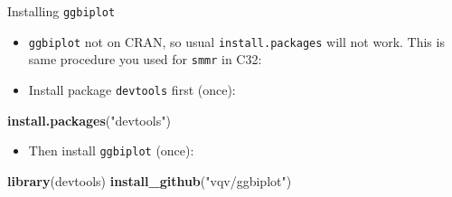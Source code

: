 \documentclass[
  ignorenonframetext,
]{beamer}
\newenvironment{Shaded}{\begin{snugshade}}{\end{snugshade}}
\newcommand{\KeywordTok}[1]{\textcolor[rgb]{0.13,0.29,0.53}{\textbf{#1}}}
\newcommand{\NormalTok}[1]{#1}
\newcommand{\StringTok}[1]{\textcolor[rgb]{0.31,0.60,0.02}{#1}}
\providecommand{\tightlist}{%
  \setlength{\itemsep}{0pt}\setlength{\parskip}{0pt}}
\begin{document}
\begin{frame}[fragile]{Installing \texttt{ggbiplot}}
\protect\hypertarget{installing-ggbiplot-1}{}

\begin{itemize}
\item
  \texttt{ggbiplot} not on CRAN, so usual \texttt{install.packages} will
  not work. This is same procedure you used for \texttt{smmr} in C32:
\item
  Install package \texttt{devtools} first (once):
\end{itemize}

\begin{Shaded}
\begin{Highlighting}[]
\KeywordTok{install.packages}\NormalTok{(}\StringTok{"devtools"}\NormalTok{)}
\end{Highlighting}
\end{Shaded}

\begin{itemize}
\tightlist
\item
  Then install \texttt{ggbiplot} (once):
\end{itemize}

\begin{Shaded}
\begin{Highlighting}[]
\KeywordTok{library}\NormalTok{(devtools)}
\KeywordTok{install_github}\NormalTok{(}\StringTok{"vqv/ggbiplot"}\NormalTok{)}
\end{Highlighting}
\end{Shaded}

\end{frame}
\end{document}
